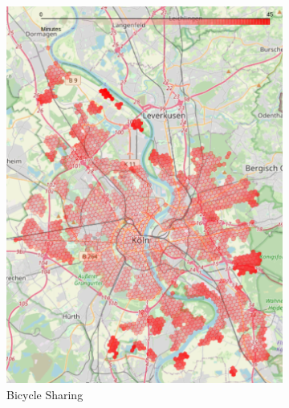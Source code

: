 \begin{figure}
\begin{subfigure}[b]{0.3\textwidth}
         \includegraphics[width=\textwidth]{Figures/results/minute_city_metric/bicycle_optimal_map}
         \caption{Bicycle Sharing}
         \label{fig:bicycle_optimal_map}
     \end{subfigure}
     \hfill
     \begin{subfigure}[b]{0.3\textwidth}
         \centering

\end{subfigure}
\end{figure}
